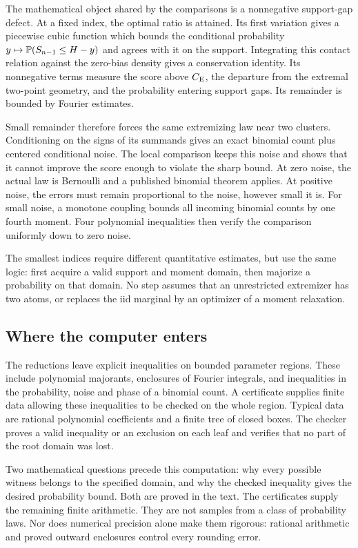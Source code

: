The mathematical object shared by the comparisons is a nonnegative
support-gap defect. At a fixed index, the optimal ratio is attained.
Its first variation gives a piecewise cubic function which bounds the
conditional probability $y\mapsto\mathbb P(S_{n-1}\le H-y)$ and agrees
with it on the support. Integrating this contact relation against the
zero-bias density gives a conservation identity. Its nonnegative terms
measure the score above $C_{\mathrm E}$, the departure from the extremal
two-point geometry, and the probability entering support gaps. Its
remainder is bounded by Fourier estimates.

Small remainder therefore forces the same extremizing law near two
clusters. Conditioning on the signs of its summands gives an exact
binomial count plus centered conditional noise. The local comparison
keeps this noise and shows that it cannot improve the score enough to
violate the sharp bound. At zero noise, the actual law is Bernoulli and
a published binomial theorem applies. At positive noise, the errors
must remain proportional to the noise, however small it is.
For small noise, a monotone coupling bounds all incoming binomial counts
by one fourth moment. Four polynomial inequalities then verify the
comparison uniformly down to zero noise.

The smallest indices require different quantitative estimates, but
use the same logic: first acquire a valid support and moment domain,
then majorize a probability on that domain. No step assumes that an
unrestricted extremizer has two atoms, or replaces the iid marginal by
an optimizer of a moment relaxation.

\subsection{Where the computer enters}

The reductions leave explicit inequalities on bounded parameter
regions. These include polynomial majorants, enclosures of Fourier
integrals, and inequalities in the probability, noise and phase of a
binomial count. A certificate supplies finite data allowing these
inequalities to be checked on the whole region. Typical data are
rational polynomial coefficients and a finite tree of closed boxes.
The checker proves a valid inequality or an exclusion on each leaf
and verifies that no part of the root domain was lost.

Two mathematical questions precede this computation: why every
possible witness belongs to the specified domain, and why the checked
inequality gives the desired probability bound. Both are proved in
the text. The certificates supply the remaining finite arithmetic.
They are not samples from a class of probability laws. Nor does
numerical precision alone make them rigorous: rational arithmetic and
proved outward enclosures control every rounding error.


